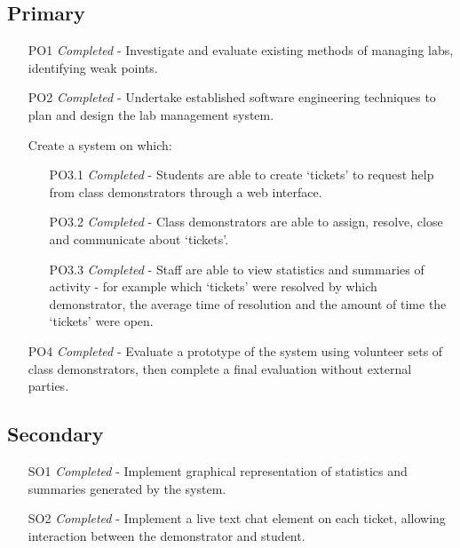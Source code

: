 \subsection{Primary}
\begin{itemize}
    \item [PO1] \textit{Completed} - Investigate and evaluate existing methods of managing labs, identifying weak points.
    \item [PO2] \textit{Completed} - Undertake established software engineering techniques to plan and design the lab management system.
    \item [] Create a system on which:
    \begin{itemize}
        \item [PO3.1] \textit{Completed} - Students are able to create `tickets' to request help from class demonstrators through a web interface.
        \item [PO3.2] \textit{Completed} - Class demonstrators are able to assign, resolve, close and communicate about `tickets'.
        \item [PO3.3] \textit{Completed} - Staff are able to view statistics and summaries of activity - for example which `tickets' were resolved by which demonstrator, the average time of resolution and the amount of time the `tickets' were open.
    \end{itemize}
    \item [PO4] \textit{Completed} - Evaluate a prototype of the system using volunteer sets of class demonstrators, then complete a final evaluation without external parties. 
    
\end{itemize}

\subsection{Secondary}
\begin{itemize}
    \item [SO1] \textit{Completed} - Implement graphical representation of statistics and summaries generated by the system.
    \item [SO2] \textit{Completed} - Implement a live text chat element on each ticket, allowing interaction between the demonstrator and student.
\end{itemize}

